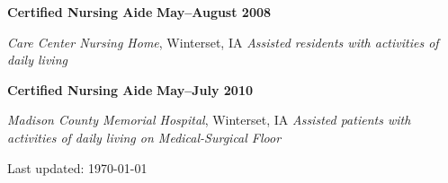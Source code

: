 \documentclass[10pt,letterpaper]{article}
\renewenvironment{itemize}{
  \begin{list}{}{
      \setlength{\leftmargin}{1.5em}
      \setlength{\itemsep}{0.25em}
      \setlength{\parskip}{0pt}
      \setlength{\parsep}{0.25em}
    }
  }{
  \end{list}
}
\newcommand{\yearrange}[1]{\hfill \textbf{#1} \par}
\begin{document}
\begin{itemize}
\item \textbf{Certified Nursing Aide} \yearrange{May--August 2008}
  \textit{Care Center Nursing Home}, Winterset, IA
  \textit{Assisted residents with activities of daily living}
\item \textbf{Certified Nursing Aide} \yearrange{May--July 2010}
  \textit{Madison County Memorial Hospital}, Winterset, IA
  \textit{Assisted patients with activities of daily living on Medical-Surgical Floor}
\end{itemize}

\medskip

\begin{center}
  \begin{small}
    Last updated: \today
  \end{small}
\end{center}
\end{document}
